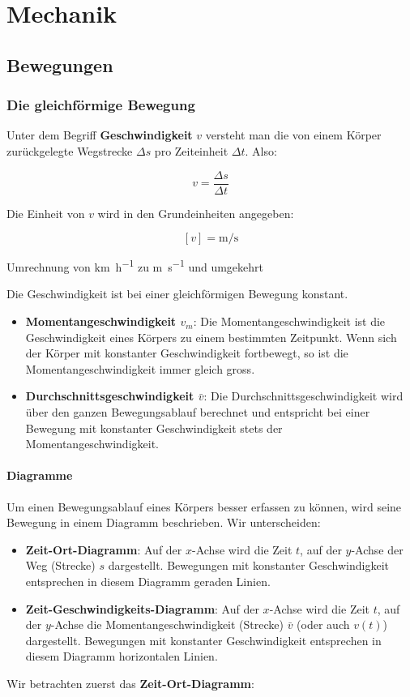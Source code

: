 \part{Mechanik}
\chapter{Bewegungen} %
\section{Die gleichförmige Bewegung}

Unter dem Begriff \textbf{Geschwindigkeit} $v$ versteht man die von einem Körper zurückgelegte Wegstrecke $\Delta s$ pro Zeiteinheit $\Delta t$. Also:

\[ v = \frac{\Delta s}{\Delta t} \]

Die Einheit von $v$ wird in den Grundeinheiten angegeben:

\[ \left[ v \right] = \si{\metre \per \second} \]


\begin{regel}Umrechnung von \si{\kilo \metre \per \hour} zu \si{\metre \per \second} und umgekehrt
\vspace{3cm}
\end{regel}
Die Geschwindigkeit ist bei einer gleichförmigen Bewegung konstant. 
\begin{itemize}
    \item \textbf{Momentangeschwindigkeit $v_{m}$}: Die Momentangeschwindigkeit ist die Geschwindigkeit eines Körpers zu einem bestimmten Zeitpunkt. Wenn sich der Körper mit konstanter Geschwindigkeit fortbewegt, so ist die Momentangeschwindigkeit immer gleich gross.
	\item \textbf{Durchschnittsgeschwindigkeit $\bar{v}$}: Die Durchschnittsgeschwindigkeit wird über den ganzen Bewegungsablauf berechnet und entspricht bei einer Bewegung mit konstanter Geschwindigkeit stets der Momentangeschwindigkeit.
\end{itemize}

\subsection{Diagramme}

Um einen Bewegungsablauf eines Körpers besser erfassen zu können, wird seine Bewegung in einem Diagramm beschrieben. Wir unterscheiden:
\begin{itemize}
	\item \textbf{Zeit-Ort-Diagramm}: Auf der $x$-Achse wird die Zeit $t$, auf der $y$-Achse der Weg (Strecke) $s$ dargestellt. Bewegungen mit konstanter Geschwindigkeit entsprechen in diesem Diagramm geraden Linien.
	\item \textbf{Zeit-Geschwindigkeits-Diagramm}: Auf der $x$-Achse wird die Zeit $t$, auf der $y$-Achse die Momentangeschwindigkeit (Strecke) $\bar{v}$ (oder auch $v(t)$) dargestellt. Bewegungen mit konstanter Geschwindigkeit entsprechen in diesem Diagramm horizontalen Linien.
\end{itemize}
Wir betrachten zuerst das \textbf{Zeit-Ort-Diagramm}:

